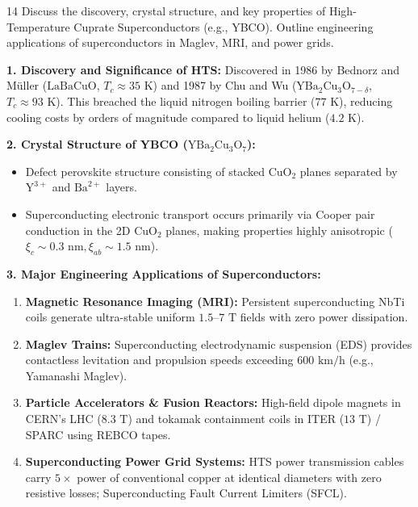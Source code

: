 \begin{theoryq}{14}
Discuss the discovery, crystal structure, and key properties of High-Temperature Cuprate Superconductors (e.g., YBCO). Outline engineering applications of superconductors in Maglev, MRI, and power grids.
\end{theoryq}
\begin{theorysol}
\textbf{1. Discovery and Significance of HTS:}
Discovered in 1986 by Bednorz and Müller ($\text{LaBaCuO}$, $T_c \approx 35\text{ K}$) and 1987 by Chu and Wu ($\text{YBa}_2\text{Cu}_3\text{O}_{7-\delta}$, $T_c \approx 93\text{ K}$).
This breached the liquid nitrogen boiling barrier ($77\text{ K}$), reducing cooling costs by orders of magnitude compared to liquid helium ($4.2\text{ K}$).

\textbf{2. Crystal Structure of YBCO ($\text{YBa}_2\text{Cu}_3\text{O}_7$):}
\begin{itemize}
\item Defect perovskite structure consisting of stacked $\text{CuO}_2$ planes separated by $\text{Y}^{3+}$ and $\text{Ba}^{2+}$ layers.
\item Superconducting electronic transport occurs primarily via Cooper pair conduction in the 2D $\text{CuO}_2$ planes, making properties highly anisotropic ($\xi_c \sim 0.3\text{ nm}, \xi_{ab} \sim 1.5\text{ nm}$).
\end{itemize}

\textbf{3. Major Engineering Applications of Superconductors:}
\begin{enumerate}
\item \textbf{Magnetic Resonance Imaging (MRI):} Persistent superconducting NbTi coils generate ultra-stable uniform $1.5\text{--}7\text{ T}$ fields with zero power dissipation.
\item \textbf{Maglev Trains:} Superconducting electrodynamic suspension (EDS) provides contactless levitation and propulsion speeds exceeding $600\text{ km/h}$ (e.g., Yamanashi Maglev).
\item \textbf{Particle Accelerators \& Fusion Reactors:} High-field dipole magnets in CERN's LHC ($8.3\text{ T}$) and tokamak containment coils in ITER ($13\text{ T}$) / SPARC using REBCO tapes.
\item \textbf{Superconducting Power Grid Systems:} HTS power transmission cables carry $5\times$ power of conventional copper at identical diameters with zero resistive losses; Superconducting Fault Current Limiters (SFCL).
\end{enumerate}
\end{theorysol}
\vspace{4mm}

